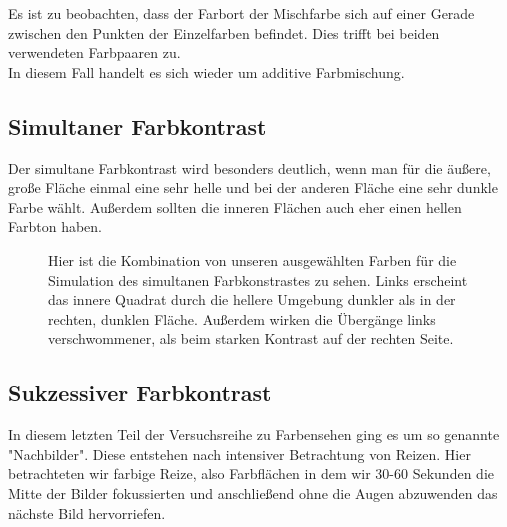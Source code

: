 \documentclass[11pt]{article}
\begin{document}
Es ist zu beobachten, dass der Farbort der Mischfarbe sich auf einer Gerade zwischen den Punkten der Einzelfarben befindet. Dies trifft bei beiden verwendeten Farbpaaren zu. \\

In diesem Fall handelt es sich wieder um additive Farbmischung. 

\subsection{Simultaner Farbkontrast}
Der simultane Farbkontrast wird besonders deutlich, wenn man für die äußere, große Fläche einmal eine sehr helle und bei der anderen Fläche eine sehr dunkle Farbe wählt. Außerdem sollten die inneren Flächen auch eher einen hellen Farbton haben. 

\begin{figure}[H]
\caption{Hier ist die Kombination von unseren ausgewählten Farben für die Simulation des simultanen Farbkonstrastes zu sehen. Links erscheint das innere Quadrat durch die hellere Umgebung dunkler als in der rechten, dunklen Fläche. Außerdem wirken die Übergänge links verschwommener, als beim starken Kontrast auf der rechten Seite.}
\label{meta2}
\end{figure}

\subsection{Sukzessiver Farbkontrast}
In diesem letzten Teil der Versuchsreihe zu Farbensehen ging es um so genannte "{}Nachbilder"{}. Diese entstehen nach intensiver Betrachtung von Reizen. Hier betrachteten wir farbige Reize, also Farbflächen in dem wir 30-60 Sekunden die Mitte der Bilder fokussierten und anschließend ohne die Augen abzuwenden das nächste Bild hervorriefen.
\end{document}
